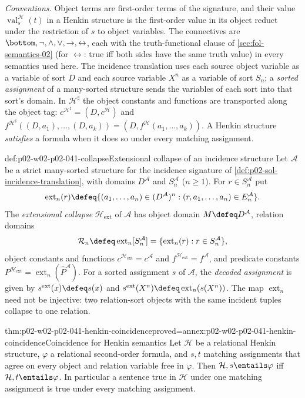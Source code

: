 \emph{Conventions.}  Object terms are first-order terms of the signature, and
their value \(\operatorname{val}^{\mathcal H}_s(t)\) in a Henkin structure is
the first-order value in its object reduct under the restriction of \(s\) to
object variables.  The connectives are
\(\bottom,\neg,\land,\lor,\to,\leftrightarrow\), each with the
truth-functional clause of \cref{sec:fol-semantics-02} (for
\(\leftrightarrow\): true iff both sides have the same truth value) in every
semantics used here.  The incidence translation uses each source object
variable as a variable of sort \(D\) and each source variable \(X^n\) as a
variable of sort \(S_n\); a \emph{sorted assignment} of a many-sorted
structure sends the variables of each sort into that sort's domain.  In
\(\mathcal H^\sharp\) the object constants and functions are transported along
the object tag:
\(c^{\mathcal H^\sharp}=(D,c^{\mathcal H})\) and
\(f^{\mathcal H^\sharp}((D,a_1),\ldots,(D,a_k))=(D,f^{\mathcal H}(a_1,\ldots,a_k))\).
A Henkin structure \emph{satisfies} a formula when it does so under every
matching assignment.

\begin{hbdefinition}{def:p02-w02-p02-041-collapse}{Extensional collapse of an incidence structure}
Let \(\mathcal A\) be a strict many-sorted structure for the incidence
signature of \cref{def:p02-sol-incidence-translation}, with domains
\(D^{\mathcal A}\) and \(S_n^{\mathcal A}\) (\(n\geq1\)).  For
\(r\in S_n^{\mathcal A}\) put
\[
 \operatorname{ext}_n(r)\defeq
 \{(a_1,\ldots,a_n)\in(D^{\mathcal A})^n:
   (r,a_1,\ldots,a_n)\in E_n^{\mathcal A}\}.
\]
The \emph{extensional collapse} \(\mathcal H_{\mathrm{ext}}\) of
\(\mathcal A\) has object domain \(M\defeq D^{\mathcal A}\), relation domains
\[
 \mathcal R_n\defeq\operatorname{ext}_n[S_n^{\mathcal A}]
 =\{\operatorname{ext}_n(r):r\in S_n^{\mathcal A}\},
\]
object constants and functions \(c^{\mathcal H_{\mathrm{ext}}}=c^{\mathcal
A}\) and \(f^{\mathcal H_{\mathrm{ext}}}=f^{\mathcal A}\), and predicate
constants \(P^{\mathcal H_{\mathrm{ext}}}=\operatorname{ext}_n(\widehat
P^{\mathcal A})\).  For a sorted assignment \(s\) of \(\mathcal A\), the
\emph{decoded assignment} is given by
\(s^{\mathrm{ext}}(x)\defeq s(x)\) and
\(s^{\mathrm{ext}}(X^n)\defeq\operatorname{ext}_n(s(X^n))\).
The map \(\operatorname{ext}_n\) need not be injective: two relation-sort
objects with the same incident tuples collapse to one relation.
\end{hbdefinition}

\begin{hblemma}{thm:p02-w02-p02-041-henkin-coincidence}{proved=annex:p02-w02-p02-041-henkin-coincidence}{Coincidence for Henkin semantics}
Let \(\mathcal H\) be a relational Henkin structure, \(\varphi\) a relational
second-order formula, and \(s,t\) matching assignments that agree on every
object and relation variable free in \(\varphi\).  Then
\(\mathcal H,s\entails\varphi\) iff \(\mathcal H,t\entails\varphi\).  In
particular a sentence true in \(\mathcal H\) under one matching assignment is
true under every matching assignment.
\end{hblemma}

